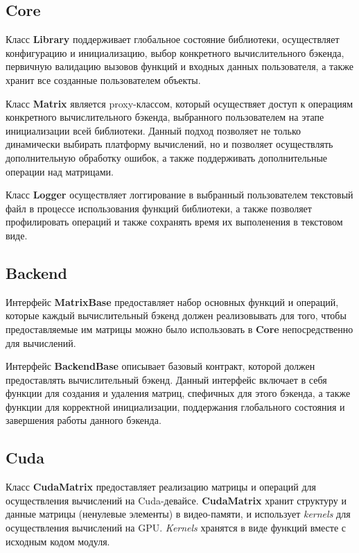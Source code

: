\subsection*{Core}

Класс \textbf{Library} поддерживает глобальное состояние библиотеки, осуществляет конфигурацию и инициализацию, выбор конкретного вычислительного бэкенда, первичную валидацию вызовов функций и входных данных пользователя, 
а также хранит все созданные пользователем объекты. 

Класс \textbf{Matrix} является proxy-классом, который осуществяет доступ к операциям конкретного вычислительного бэкенда, выбранного пользователем на этапе инициализации всей библиотеки.
Данный подход позволяет не только динамически выбирать платформу вычислений, 
но и позволяет осуществлять дополнительную обработку ошибок, 
а также поддерживать дополнительные операции над матрицами.

Класс \textbf{Logger} осуществляет логгирование в выбранный пользователем текстовый файл в процессе использования функций библиотеки, а также позволяет профилировать операций и также сохранять время их выполенения в текстовом виде.

\subsection*{Backend}

Интерфейс \textbf{MatrixBase} предоставляет набор основных функций и операций, которые каждый вычислительный бэкенд должен реализовывать для того, чтобы предоставляемые им матрицы можно было использовать в \textbf{Core} непосредственно для вычислений.

Интерфейс \textbf{BackendBase} описывает базовый контракт, которой должен предоставлять вычислительный бэкенд. Данный интерфейс включает в себя функции для создания и удаления матриц, спефичных для этого бэкенда, а также функции для корректной инициализации, поддержания глобального состояния и завершения работы данного бэкенда.

\subsection*{Cuda}

Класс \textbf{CudaMatrix} предоставляет реализацию матрицы и операций для осуществления вычислений на Cuda-девайсе. \textbf{CudaMatrix} хранит структуру и данные матрицы (ненулевые элементы) в видео-памяти, и использует \textit{kernels} для осуществления вычислений на GPU. \textit{Kernels} хранятся в виде функций вместе с исходным кодом модуля.

